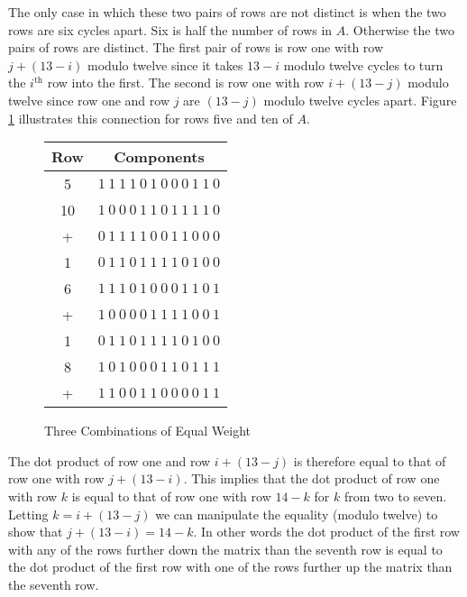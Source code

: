 The only case in which these two pairs of rows are not distinct is when the two rows are six cycles apart.
Six is half the number of rows in $A$.
Otherwise the two pairs of rows are distinct.
The first pair of rows is row one with row $j+(13-i)$ modulo twelve since it takes $13-i$ modulo twelve cycles to turn the $i^{\textrm{th}}$ row into the first.
The second is row one with row $i+(13-j)$ modulo twelve since row one and row $j$ are $(13-j)$ modulo twelve cycles apart.
Figure \ref{fig:rowcycles} illustrates this connection for rows five and ten of $A$.
\begin{figure}
\begin{center}
\begin{tabular}{|c|c|}
	\hline
	Row & Components \\
	\hline	
	5  & $1\ 1\ 1\ 1\ 0\ 1\ 0\ 0\ 0\ 1\ 1\ 0$ \\
	10 & $1\ 0\ 0\ 0\ 1\ 1\ 0\ 1\ 1\ 1\ 1\ 0$ \\
	\hline
\rowcolor[rgb]{0.8,0.8,0.8}	+  & $0\ 1\ 1\ 1\ 1\ 0\ 0\ 1\ 1\ 0\ 0\ 0$\\
	\hline
	\hline
	1  & $0\ 1\ 1\ 0\ 1\ 1\ 1\ 1\ 0\ 1\ 0\ 0$\\
	6  & $1\ 1\ 1\ 0\ 1\ 0\ 0\ 0\ 1\ 1\ 0\ 1$\\
	\hline
\rowcolor[rgb]{0.8,0.8,0.8}	+  & $1\ 0\ 0\ 0\ 0\ 1\ 1\ 1\ 1\ 0\ 0\ 1$\\
	\hline
	\hline
	1  & $0\ 1\ 1\ 0\ 1\ 1\ 1\ 1\ 0\ 1\ 0\ 0$\\
	8  & $1\ 0\ 1\ 0\ 0\ 0\ 1\ 1\ 0\ 1\ 1\ 1$\\
	\hline
\rowcolor[rgb]{0.8,0.8,0.8}	+  & $1\ 1\ 0\ 0\ 1\ 1\ 0\ 0\ 0\ 0\ 1\ 1$\\
	\hline 
	
	
\end{tabular}
\caption{Three Combinations of Equal Weight}
\label{fig:rowcycles}
\end{center}
\end{figure}

The dot product of row one and row $i+(13-j)$ is therefore equal to that of row one with row $j+(13-i)$.
This implies that the dot product of row one with row $k$ is equal to that of row one with row $14-k$ for $k$ from two to seven.
Letting $k=i+(13-j)$ we can manipulate the equality (modulo twelve) to show that $j+(13-i)=14-k$.
In other words the dot product of the first row with any of the rows further down the matrix than the seventh row is equal to the dot product of the first row with one of the rows further up the matrix than the seventh row.


